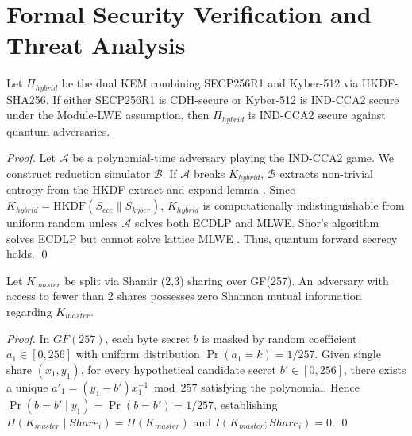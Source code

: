 \documentclass{llncs}
\begin{document}
\section{Formal Security Verification and Threat Analysis}
\begin{theorem}
Let $\Pi_{hybrid}$ be the dual KEM combining SECP256R1 and Kyber-512 via HKDF-SHA256. If either SECP256R1 is CDH-secure or Kyber-512 is IND-CCA2 secure under the Module-LWE assumption, then $\Pi_{hybrid}$ is IND-CCA2 secure against quantum adversaries.
\end{theorem}
\begin{proof}
Let $\mathcal{A}$ be a polynomial-time adversary playing the IND-CCA2 game. We construct reduction simulator $\mathcal{B}$. If $\mathcal{A}$ breaks $K_{hybrid}$, $\mathcal{B}$ extracts non-trivial entropy from the HKDF extract-and-expand lemma \cite{krawczyk2010hmac}. Since $K_{hybrid} = \text{HKDF}(S_{ecc} \parallel S_{kyber})$, $K_{hybrid}$ is computationally indistinguishable from uniform random unless $\mathcal{A}$ solves both ECDLP and MLWE. Shor's algorithm solves ECDLP but cannot solve lattice MLWE \cite{avanzi2021crystals}. Thus, quantum forward secrecy holds. \qed
\end{proof}

\begin{theorem}
Let $K_{master}$ be split via Shamir (2,3) sharing over GF(257). An adversary with access to fewer than 2 shares possesses zero Shannon mutual information regarding $K_{master}$.
\end{theorem}
\begin{proof}
In $GF(257)$, each byte secret $b$ is masked by random coefficient $a_1 \in [0, 256]$ with uniform distribution $\Pr(a_1 = k) = 1/257$. Given single share $(x_1, y_1)$, for every hypothetical candidate secret $b' \in [0, 256]$, there exists a unique $a'_1 = (y_1 - b')x_1^{-1} \bmod 257$ satisfying the polynomial. Hence $\Pr(b = b' \mid y_1) = \Pr(b = b') = 1/257$, establishing $H(K_{master} \mid Share_i) = H(K_{master})$ and $I(K_{master}; Share_i) = 0$. \qed
\end{proof}
\end{document}
